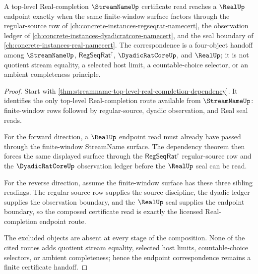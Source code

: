 \begin{theorem}
\label{thm:streamname-regseqrat-dyadic-real-endpoint-correspondence}
A top-level Real-completion $\StreamNameUp$ certificate read reaches a $\RealUp$ endpoint exactly when the same finite-window surface factors through the regular-source row of \autoref{ch:concrete-instances-regseqrat-namecert}, the observation ledger of \autoref{ch:concrete-instances-dyadicratcore-namecert}, and the seal boundary of \autoref{ch:concrete-instances-real-namecert}. The correspondence is a four-object handoff among $\StreamNameUp$, $\mathsf{RegSeqRat}^{\uparrow}$, $\DyadicRatCoreUp$, and $\RealUp$; it is not quotient stream equality, a selected host limit, a countable-choice selector, or an ambient completeness principle.
\end{theorem}
\begin{proof}
Start with \autoref{thm:streamname-top-level-real-completion-dependency}. It identifies the only top-level Real-completion route available from $\StreamNameUp$: finite-window rows followed by regular-source, dyadic observation, and Real seal reads.

For the forward direction, a $\RealUp$ endpoint read must already have passed through the finite-window StreamName surface. The dependency theorem then forces the same displayed surface through the $\mathsf{RegSeqRat}^{\uparrow}$ regular-source row and the $\DyadicRatCoreUp$ observation ledger before the $\RealUp$ seal can be read.

For the reverse direction, assume the finite-window surface has these three sibling readings. The regular-source row supplies the source discipline, the dyadic ledger supplies the observation boundary, and the $\RealUp$ seal supplies the endpoint boundary, so the composed certificate read is exactly the licensed Real-completion endpoint route.

The excluded objects are absent at every stage of the composition. None of the cited routes adds quotient stream equality, selected host limits, countable-choice selectors, or ambient completeness; hence the endpoint correspondence remains a finite certificate handoff.
\end{proof}

